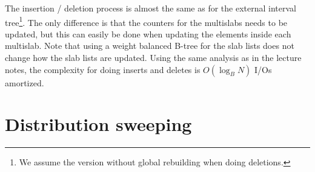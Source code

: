 \documentclass[a4paper,12pt]{article}
\begin{document}
The insertion / deletion process is almost the same as for the external interval tree\footnote{We assume the version without global rebuilding when doing deletions.}. The only difference is that the counters for the multislabs needs to be updated, but this can easily be done when updating the elements inside each multislab. Note that using a weight balanced B-tree for the slab lists does not change how the slab lists are updated. Using the same analysis as in the lecture notes, the complexity for doing inserts and deletes is $O(\log_B N)$ I/Os amortized.

\pagebreak
\section{Distribution sweeping}



%
\end{document}

